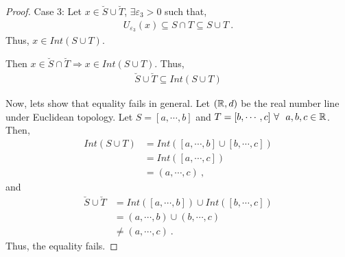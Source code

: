\begin{questions}
\begin{solution}
\begin{proof}
Case 3: Let $x \in \breve{S} \cup \breve{T}$, $\exists \varepsilon_3>0$ such that,
\begin{align*}
U_{\varepsilon_3}(x) \subseteq S \cap T \subseteq S \cup T~.
\end{align*}
Thus, $x \in Int(S \cup T)$.
\vspace{5mm}

Then $x \in \breve{S}\cap \breve{T} \Rightarrow x \in Int(S \cup T)$. Thus,
\begin{align*}
\breve{S} \cup \breve{T} \subseteq Int(S \cup T)
\end{align*}
\vspace{7mm}

Now, lets show that equality fails in general. Let $(\mathbb{R}, d)$ be the real number line under Euclidean topology.   Let $S = [a, \cdots, b]$ and $T = [b, \cdots, c] ~\forall~~a,b,c \in \mathbb{R}$. Then,
\begin{align*}
Int(S \cup T) &= Int([a, \cdots, b] \cup [b, \cdots, c])\\
& = Int([a, \cdots, c]) \\
& = (a, \cdots, c)~,
\end{align*}
and
\begin{align*}
\breve{S} \cup \breve{T} &= Int([a, \cdots, b]) \cup Int([b, \cdots, c]) \\
& = (a, \cdots, b) \cup (b, \cdots, c) \\
& \neq (a, \cdots, c)~.
\end{align*}
Thus, the equality fails.

  \end{proof} 
\end{solution}

\end{questions}